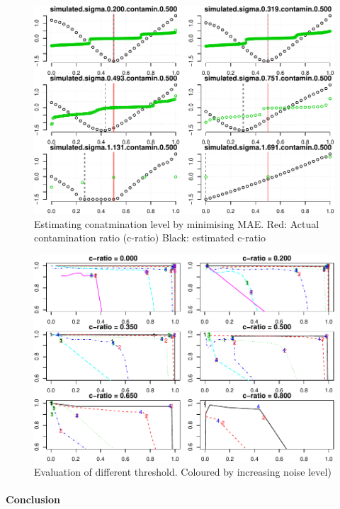 \documentclass[]{article}
\let\oldparagraph\paragraph
\renewcommand{\paragraph}[1]{\oldparagraph{#1}\mbox{}}
\begin{document}
\begin{figure}
\centering
\includegraphics{copynumber_files/figure-latex/contam_est-1.pdf}
\caption{\label{fig:contam_est} Estimating conatmination level by
minimising MAE. Red: Actual contamination ratio (c-ratio) Black:
estimated c-ratio}
\end{figure}

\begin{figure}
\centering
\includegraphics{copynumber_files/figure-latex/plot__PR2-1.pdf}
\caption{\label{fig:eval_thres2} Evaluation of different threshold.
Coloured by increasing noise level)}
\end{figure}

\paragraph{Conclusion}\label{conclusion}
\end{document}
